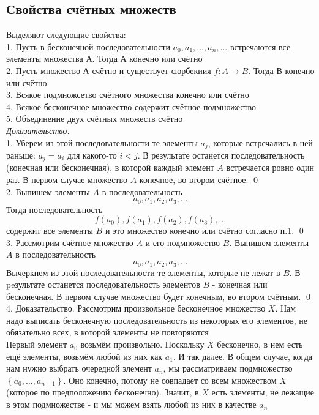\documentclass[a4paper]{article}
\begin{document}
\subsection{Свойства счётных множеств}
\label{sec:2.30}Выделяют следующие свойства:\\[2mm]
 1. Пусть в бесконечной последовательности $a_{0}, a_{1}, \ldots, a_{n}, \ldots$
встречаются все элементы множества А. Тогда А конечно или счётно\\[2mm]
 2. Пусть множество А счётно и существует сюрбекиия $f: A \rightarrow B$. Тогда В конечно или счётно\\[2mm]
 3. Всякое подмножсетво счётного множества конечно или счётно\\[2mm]
 4. Всякое бесконечное множество содержит счётное подмножество\\[2mm]
 5. Объединение двух счётных множеств счётно\\[2mm]
\textit{Доказательство.}\\[2mm]
 1. Уберем из этой последовательности те элементы $a_{j}$, которые встречались в ней раньше: $a_{j}=a_{i}$ для какого-то $i<j$. В результате останется последовательность (конечная или бесконечная), в которой каждый элемент $A$ встречается ровно один раз. В первом случае множество $A$ конечное, во втором счётное. \qed\\[2mm]
 2. Выпишем элементы $A$ в последовательность
$$
a_{0}, a_{1}, a_{2}, a_{3}, \ldots
$$
Тогда последовательность
$$
f\left(a_{0}\right), f\left(a_{1}\right), f\left(a_{2}\right), f\left(a_{3}\right), \ldots
$$
содержит все элементы $B$ и это множество конечно или счётно согласно п.1. \qed\\[2mm]
 3. Рассмотрим счётное множество $A$ и его подмножество $B$. Выпишем элементы $A$ в последовательность
$$
a_{0}, a_{1}, a_{2}, a_{3}, \ldots
$$
Вычеркнем из этой последовательности те элементы, которые не лежат в $B$. В peзультате останется последовательность элементов $B$ - конечная или бесконечная. В первом случае множество будет конечным, во втором счётным. \qed\\[2mm]
 4. Доказательство. Рассмотрим произвольное бесконечное множество $X$. Нам надо выписать бесконечную последовательность из некоторых его элементов, не обязательно всех, в которой элементы не повторяются\\[2mm]
 Первый элемент $a_{0}$ возьмём произвольно. Поскольку $X$ бесконечно, в нем есть ещё элементы, возьмём любой из них как $a_{1}$. И так далее. В общем случае, когда нам нужно выбрать очередной элемент $a_{n}$, мы рассматриваем подмножество $\left\{a_{0}, \ldots, a_{n-1}\right\}$. Оно конечно, потому не совпадает со всем множеством $X$ (которое по предположению бесконечно). Значит, в $X$ есть элементы, не лежащие в этом подмножестве - и мы можем взять любой из них в качестве $a_{n}$\\[2mm]
\end{document}
